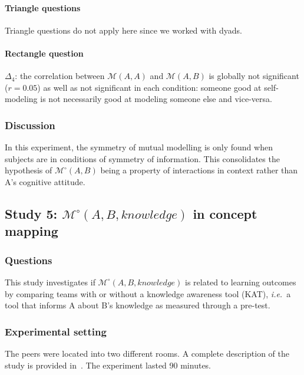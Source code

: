 \documentclass[twocolumn]{article}
\newcommand{\ie}{{\textit{i.e.\ }}}
\newcommand{\gmodel}[2]{{$\mathcal{M}(#1, #2)$}}
\newcommand{\Model}[3]{{$\mathcal{M}^{\circ}(#1, #2, #3)$}}
\newcommand{\gModel}[2]{{$\mathcal{M}^{\circ}(#1, #2)$}}
\begin{document}
\paragraph{Triangle questions} Triangle questions do not apply here since we
worked with dyads.

\paragraph{Rectangle question}$\Delta_4$: the correlation between \gmodel{A}{A}
and \gmodel{A}{B} is globally not significant ($r=0.05$) as well as not
significant in each condition: someone good at self-modeling is not necessarily
good at modeling someone else and vice-versa.

\subsubsection*{Discussion}

In this experiment, the symmetry of mutual modelling is only found when subjects
are in conditions of symmetry of information. This consolidates the hypothesis
of \gModel{A}{B} being a property of interactions in context rather than A's
cognitive attitude.



\subsection{Study 5: \Model{A}{B}{knowledge} in concept mapping}

\subsubsection*{Questions}

This study investigates if \Model{A}{B}{knowledge} is related to learning
outcomes by comparing teams with or without a knowledge awareness tool (KAT),
\ie a tool that informs A about B's knowledge as measured through a pre-test.

\subsubsection*{Experimental setting}

The peers were located into two different rooms. A complete description of the
study is provided in~\cite{sangin2008learners}. The experiment lasted 90 minutes.
\end{document}
